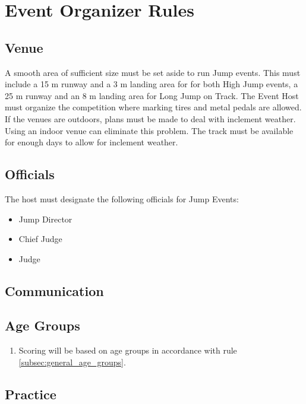 \chapter{Event Organizer Rules}

\section{Venue}
A smooth area of sufficient size must be set aside to run Jump events.
This must include a 15 m runway and a 3 m landing area for for both High Jump events, a 25 m runway and an 8 m landing area for Long Jump on Track.
The Event Host must organize the competition where marking tires and metal pedals are allowed.
If the venues are outdoors, plans must be made to deal with inclement weather.
Using an indoor venue can eliminate this problem.
The track must be available for enough days to allow for inclement weather.

\section{Officials}

The host must designate the following officials for Jump Events:
\begin{itemize}
\item Jump Director
\item Chief Judge
\item Judge
\end{itemize}

\begin{comment2016}
\section{Communication}
\end{comment2016}

\section{Age Groups}

\begin{enumerate}[leftmargin=1.5em,labelsep=*]
	\item Scoring will be based on age groups in accordance with rule \ref{subsec:general_age_groups}.
\end{enumerate}

\section{Practice}

